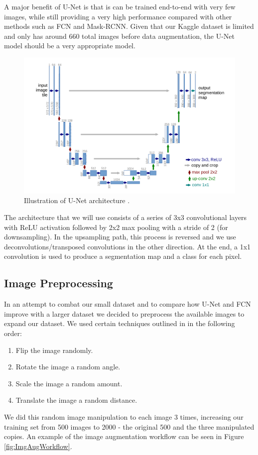 \documentclass{article}
\begin{document}
A major benefit of U-Net is that is can be trained end-to-end with very few images, while still providing a very high performance compared with other methods such as FCN and Mask-RCNN. Given that our Kaggle dataset is limited and only has around 660 total images before data augmentation, the U-Net model should be a very appropriate model.

\begin{figure}[htbp]
\vskip 5mm
\begin{center}
\centerline{\includegraphics[scale=0.25]{mlp-cw3-template/Figures/unet.png}}
\caption{Illustration of U-Net architecture \cite{Ronneberger2015UNetCN}.}
\label{fig:UNET}
\end{center}
\vskip -5mm
\end{figure} 

The architecture that we will use consists of a series of 3x3 convolutional layers with ReLU activation followed by 2x2 max pooling with a stride of 2 (for downsampling). In the upsampling path, this process is reversed and we use deconvolutions/transposed convolutions in the other direction. At the end, a 1x1 convolution is used to produce a segmentation map and a class for each pixel.

\subsection{Image Preprocessing}
\label{sec:ImgPreProcess}

In an attempt to combat our small dataset and to compare how U-Net and FCN improve with a larger dataset we decided to preprocess the available images to expand our dataset. We used certain techniques outlined in \cite{DataAugmentation} in the following order:
\begin{enumerate}
    \item Flip the image randomly.
    \item Rotate the image a random angle.
    \item Scale the image a random amount.
    \item Translate the image a random distance.
\end{enumerate}
We did this random image manipulation to each image 3 times, increasing our training set from 500 images to 2000 - the original 500 and the three manipulated copies. An example of the image augmentation workflow can be seen in Figure \ref{fig:ImgAugWorkflow}.
\end{document}
